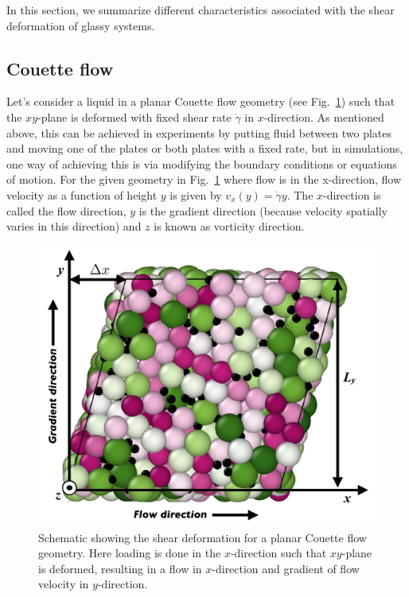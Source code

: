 In this section, we summarize different characteristics associated with the shear deformation of glassy systems.

    \subsection{Couette flow}
    
    Let's consider a liquid in a planar Couette flow geometry \cite{larson,chhabra2011non} (see Fig.~\ref{couetteFlow}) such that the $xy$-plane is deformed with fixed shear rate $\dot{\gamma}$ in $x$-direction. As mentioned above, this can be achieved in experiments by putting fluid between two plates and moving one of the plates or both plates with a fixed rate, but in simulations, one way of achieving this is via modifying the boundary conditions or equations of motion. For the given geometry in Fig.~\ref{couetteFlow} where flow is in the x-direction, flow velocity as a function of height $y$ is given by $v_x(y) = \dot{\gamma} y$. The $x$-direction is called the flow direction, $y$ is the gradient direction (because velocity spatially varies in this direction) and $z$ is known as vorticity direction.
    
    \begin{figure}[hbt!]
	\includegraphics[width=14cm]{figs/couetteFlow.pdf}
	\centering
	\caption[{\em Schematic showing the shear deformation for a planar Couette flow}]{Schematic showing the shear deformation for a planar Couette flow geometry. Here loading is done in the $x$-direction such that $xy$-plane is deformed, resulting in a flow in $x$-direction and gradient of flow velocity in $y$-direction. \label{couetteFlow}}
    \end{figure}
    
